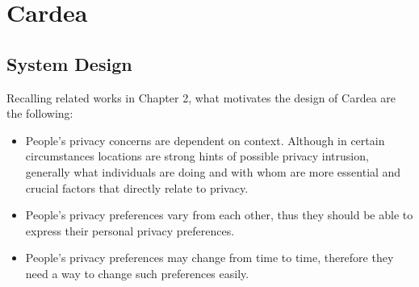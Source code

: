 \chapter{Cardea}\label{sec-cardea}

\section{System Design}
Recalling related works in Chapter 2, what motivates the design of Cardea are the following:

\begin{itemize}
\item People's privacy concerns are dependent on context. Although in certain circumstances locations are strong hints of possible privacy intrusion, generally what individuals are doing and with whom are more essential and crucial factors that directly relate to privacy.
\item People's privacy preferences vary from each other, thus they should be able to express their personal privacy preferences.
\item People's privacy preferences may change from time to time, therefore they need a way to change such preferences easily.
\end{itemize}


